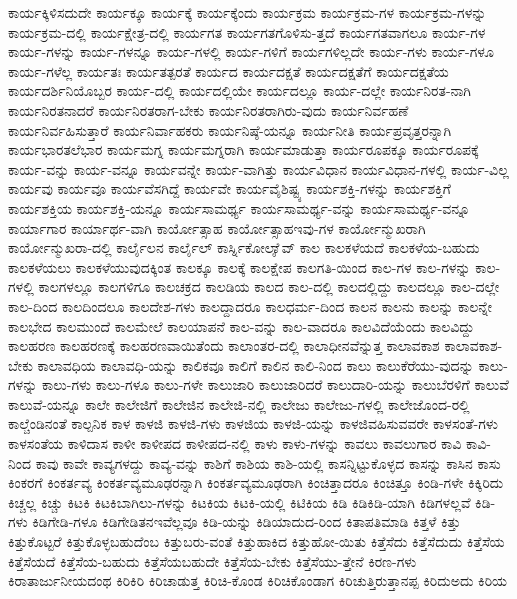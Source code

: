 {ಕಾರ್ಯಕ್ಕಿಳಿಸದುದೇ
ಕಾರ್ಯಕ್ಕೂ
ಕಾರ್ಯಕ್ಕೆ
ಕಾರ್ಯಕ್ಕೆಂದು
ಕಾರ್ಯಕ್ರಮ
ಕಾರ್ಯಕ್ರಮ-ಗಳ
ಕಾರ್ಯಕ್ರಮ-ಗಳನ್ನು
ಕಾರ್ಯಕ್ರಮ-ದಲ್ಲಿ
ಕಾರ್ಯಕ್ಷೇತ್ರ-ದಲ್ಲಿ
ಕಾರ್ಯಗತ
ಕಾರ್ಯಗತಗೊಳಿಸು-ತ್ತದೆ
ಕಾರ್ಯಗತವಾಗಲೂ
ಕಾರ್ಯ-ಗಳ
ಕಾರ್ಯ-ಗಳನ್ನು
ಕಾರ್ಯ-ಗಳನ್ನೂ
ಕಾರ್ಯ-ಗಳಲ್ಲಿ
ಕಾರ್ಯ-ಗಳಿಗೆ
ಕಾರ್ಯಗಳಿಲ್ಲದೇ
ಕಾರ್ಯ-ಗಳು
ಕಾರ್ಯ-ಗಳೂ
ಕಾರ್ಯ-ಗಳೆಲ್ಲ
ಕಾರ್ಯತಃ
ಕಾರ್ಯತತ್ಪರತೆ
ಕಾರ್ಯದ
ಕಾರ್ಯದಕ್ಷತೆ
ಕಾರ್ಯದಕ್ಷತೆಗೆ
ಕಾರ್ಯದಕ್ಷತೆಯ
ಕಾರ್ಯದರ್ಶಿನಿಯೊಬ್ಬರ
ಕಾರ್ಯ-ದಲ್ಲಿ
ಕಾರ್ಯದಲ್ಲಿಯೇ
ಕಾರ್ಯದಲ್ಲೂ
ಕಾರ್ಯ-ದಲ್ಲೇ
ಕಾರ್ಯನಿರತ-ನಾಗಿ
ಕಾರ್ಯನಿರತನಾದರೆ
ಕಾರ್ಯನಿರತರಾಗ-ಬೇಕು
ಕಾರ್ಯನಿರತರಾಗಿರು-ವುದು
ಕಾರ್ಯನಿರ್ವಹಣೆ
ಕಾರ್ಯನಿರ್ವಹಿಸುತ್ತಾರೆ
ಕಾರ್ಯನಿರ್ವಾಹಕರು
ಕಾರ್ಯನಿಷ್ಠೆ-ಯನ್ನೂ
ಕಾರ್ಯನೀತಿ
ಕಾರ್ಯಪ್ರವೃತ್ತರನ್ನಾಗಿ
ಕಾರ್ಯಭಾರತಲೆಭಾರ
ಕಾರ್ಯಮಗ್ನ
ಕಾರ್ಯಮಗ್ನರಾಗಿ
ಕಾರ್ಯಮಾಡುತ್ತಾ
ಕಾರ್ಯರೂಪಕ್ಕೂ
ಕಾರ್ಯರೂಪಕ್ಕೆ
ಕಾರ್ಯ-ವನ್ನು
ಕಾರ್ಯ-ವನ್ನೂ
ಕಾರ್ಯವನ್ನೇ
ಕಾರ್ಯ-ವಾಗಿತ್ತು
ಕಾರ್ಯವಿಧಾನ
ಕಾರ್ಯವಿಧಾನ-ಗಳಲ್ಲಿ
ಕಾರ್ಯ-ವಿಲ್ಲ
ಕಾರ್ಯವು
ಕಾರ್ಯವೂ
ಕಾರ್ಯವೆಸಗಿದ್ದೆ
ಕಾರ್ಯವೇ
ಕಾರ್ಯವೈಶಿಷ್ಟ್ಯ
ಕಾರ್ಯಶಕ್ತಿ-ಗಳನ್ನು
ಕಾರ್ಯಶಕ್ತಿಗೆ
ಕಾರ್ಯಶಕ್ತಿಯ
ಕಾರ್ಯಶಕ್ತಿ-ಯನ್ನೂ
ಕಾರ್ಯಸಾಮರ್ಥ್ಯ
ಕಾರ್ಯಸಾಮರ್ಥ್ಯ-ವನ್ನು
ಕಾರ್ಯಸಾಮರ್ಥ್ಯ-ವನ್ನೂ
ಕಾರ್ಯಾಗಾರ
ಕಾರ್ಯಾರ್ಥ-ವಾಗಿ
ಕಾರ್ಯೋತ್ಸಾಹ
ಕಾರ್ಯೋತ್ಸಾಹಇವು-ಗಳ
ಕಾರ್ಯೋನ್ಮುಖರಾಗಿ
ಕಾರ್ಯೋನ್ಮುಖರಾ-ದಲ್ಲಿ
ಕಾರ್ಲೈಲನ
ಕಾರ್ಲೈಲ್
ಕಾರ್ಸ್ನಿಕೋಲಾೈವ್
ಕಾಲ
ಕಾಲಕಳೆಯದೆ
ಕಾಲಕಳೆಯ-ಬಹುದು
ಕಾಲಕಳೆಯಲು
ಕಾಲಕಳೆಯುವುದಕ್ಕಿಂತ
ಕಾಲಕ್ಕೂ
ಕಾಲಕ್ಕೆ
ಕಾಲಕ್ಷೇಪ
ಕಾಲಗತಿ-ಯಿಂದ
ಕಾಲ-ಗಳ
ಕಾಲ-ಗಳನ್ನು
ಕಾಲ-ಗಳಲ್ಲಿ
ಕಾಲಗಳಲ್ಲೂ
ಕಾಲಗಳಿಗೂ
ಕಾಲಚಕ್ರದ
ಕಾಲಡಿಯ
ಕಾಲದ
ಕಾಲ-ದಲ್ಲಿ
ಕಾಲದಲ್ಲಿದ್ದು
ಕಾಲದಲ್ಲೂ
ಕಾಲ-ದಲ್ಲೇ
ಕಾಲ-ದಿಂದ
ಕಾಲದಿಂದಲೂ
ಕಾಲದೇಶ-ಗಳು
ಕಾಲದ್ದಾದರೂ
ಕಾಲಧರ್ಮ-ದಿಂದ
ಕಾಲನ
ಕಾಲನು
ಕಾಲನ್ನು
ಕಾಲನ್ನೇ
ಕಾಲಭೇದ
ಕಾಲಮುಂದೆ
ಕಾಲಮೇಲೆ
ಕಾಲಯಾಪನೆ
ಕಾಲ-ವನ್ನು
ಕಾಲ-ವಾದರೂ
ಕಾಲವಿದೆಯೆಂದು
ಕಾಲವಿದ್ದು
ಕಾಲಹರಣ
ಕಾಲಹರಣಕ್ಕೆ
ಕಾಲಹರಣವಾಯಿತೆಂದು
ಕಾಲಾಂತರ-ದಲ್ಲಿ
ಕಾಲಾಧೀನವೆನ್ನುತ್ತ
ಕಾಲಾವಕಾಶ
ಕಾಲಾವಕಾಶ-ಬೇಕು
ಕಾಲಾವಧಿಯ
ಕಾಲಾವಧಿ-ಯನ್ನು
ಕಾಲಿಕವೂ
ಕಾಲಿಗೆ
ಕಾಲಿನ
ಕಾಲಿ-ನಿಂದ
ಕಾಲು
ಕಾಲುಕೆರೆಯು-ವುದನ್ನು
ಕಾಲು-ಗಳನ್ನು
ಕಾಲು-ಗಳು
ಕಾಲು-ಗಳೂ
ಕಾಲು-ಗಳೇ
ಕಾಲುಜಾರಿ
ಕಾಲುಜಾರಿದರೆ
ಕಾಲುದಾರಿ-ಯನ್ನು
ಕಾಲುಬೆರಳಿಗೆ
ಕಾಲುವೆ
ಕಾಲುವೆ-ಯನ್ನೂ
ಕಾಲೇ
ಕಾಲೇಜಿಗೆ
ಕಾಲೇಜಿನ
ಕಾಲೇಜಿ-ನಲ್ಲಿ
ಕಾಲೇಜು
ಕಾಲೇಜು-ಗಳಲ್ಲಿ
ಕಾಲೇಜೊಂದ-ರಲ್ಲಿ
ಕಾಲ್ಚೆಂಡಿನಂತೆ
ಕಾಲ್ಪನಿಕ
ಕಾಳ
ಕಾಳಜಿ
ಕಾಳಜಿ-ಗಳು
ಕಾಳಜಿಯ
ಕಾಳಜಿ-ಯನ್ನು
ಕಾಳಜಿವಹಿಸುವವರೇ
ಕಾಳಸಂತೆ-ಗಳು
ಕಾಳಸಂತೆಯ
ಕಾಳಿದಾಸ
ಕಾಳೀ
ಕಾಳೀಪದ
ಕಾಳೀಪದ-ನಲ್ಲಿ
ಕಾಳು
ಕಾಳು-ಗಳನ್ನು
ಕಾವಲು
ಕಾವಲುಗಾರ
ಕಾವಿ
ಕಾವಿ-ನಿಂದ
ಕಾವು
ಕಾವೇ
ಕಾವ್ಯಗಳದ್ದು
ಕಾವ್ಯ-ವನ್ನು
ಕಾಶಿಗೆ
ಕಾಶಿಯ
ಕಾಶಿ-ಯಲ್ಲಿ
ಕಾಸನ್ನಿಟ್ಟುಕೊಳ್ಳದ
ಕಾಸನ್ನು
ಕಾಸಿನ
ಕಾಸು
ಕಿಂಕರಗೆ
ಕಿಂಕರ್ತವ್ಯ
ಕಿಂಕರ್ತವ್ಯಮೂಢರನ್ನಾಗಿ
ಕಿಂಕರ್ತವ್ಯಮೂಢರಾಗಿ
ಕಿಂಚಿತ್ತಾದರೂ
ಕಿಂಚಿತ್ತೂ
ಕಿಂಡಿ-ಗಳೇ
ಕಿಕ್ಕಿರಿದು
ಕಿಚ್ಚಲ್ಲ
ಕಿಚ್ಚು
ಕಿಟಕಿ
ಕಿಟಕಿಬಾಗಿಲು-ಗಳನ್ನು
ಕಿಟಕಿಯ
ಕಿಟಕಿ-ಯಲ್ಲಿ
ಕಿಟಿಕಿಯ
ಕಿಡಿ
ಕಿಡಿಕಿಡಿ-ಯಾಗಿ
ಕಿಡಿಗಳಲ್ಲವೆ
ಕಿಡಿ-ಗಳು
ಕಿಡಿಗೇಡಿ-ಗಳೂ
ಕಿಡಿಗೇಡಿತನಇವೆಲ್ಲವೂ
ಕಿಡಿ-ಯನ್ನು
ಕಿಡಿಯಾದುದ-ರಿಂದ
ಕಿತಾಪತಿಮಾಡಿ
ಕಿತ್ತಳೆ
ಕಿತ್ತು
ಕಿತ್ತುಕೊಟ್ಟರೆ
ಕಿತ್ತುಕೊಳ್ಳಬಹುದೆಂಬ
ಕಿತ್ತುಬರು-ವಂತೆ
ಕಿತ್ತುಹಾಕಿದ
ಕಿತ್ತುಹೋ-ಯಿತು
ಕಿತ್ತೆಸೆದು
ಕಿತ್ತೆಸೆದುದು
ಕಿತ್ತೆಸೆಯ
ಕಿತ್ತೆಸೆಯದೆ
ಕಿತ್ತೆಸೆಯ-ಬಹುದು
ಕಿತ್ತೆಸೆಯಬಹುದೇ
ಕಿತ್ತೆಸೆಯ-ಬೇಕು
ಕಿತ್ತೆಸೆಯು-ತ್ತೇನೆ
ಕಿರಣ-ಗಳು
ಕಿರಾತಾರ್ಜುನೀಯದಂಥ
ಕಿರಿಕಿರಿ
ಕಿರಿಚಾಡುತ್ತ
ಕಿರಿಚಿ-ಕೊಂಡ
ಕಿರಿಚಿಕೊಂಡಾಗ
ಕಿರಿಚುತ್ತಿರುತ್ತಾನಪ್ಪ
ಕಿರಿದುಅದು
ಕಿರಿಯ
}
